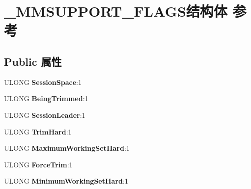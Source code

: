 \hypertarget{struct___m_m_s_u_p_p_o_r_t___f_l_a_g_s}{}\section{\+\_\+\+M\+M\+S\+U\+P\+P\+O\+R\+T\+\_\+\+F\+L\+A\+G\+S结构体 参考}
\label{struct___m_m_s_u_p_p_o_r_t___f_l_a_g_s}
\subsection*{Public 属性}
\begin{DoxyCompactItemize}
\item 
\mbox{\label{struct___m_m_s_u_p_p_o_r_t___f_l_a_g_s_a747984711b7c595f2d9e886e99a3a227}} 
U\+L\+O\+NG {\bfseries Session\+Space}\+:1
\item 
\mbox{\label{struct___m_m_s_u_p_p_o_r_t___f_l_a_g_s_a6297001da1ee1ba550d02cd224c854d2}} 
U\+L\+O\+NG {\bfseries Being\+Trimmed}\+:1
\item 
\mbox{\label{struct___m_m_s_u_p_p_o_r_t___f_l_a_g_s_a5ec9a6736d904c736a9c7a359b92b44a}} 
U\+L\+O\+NG {\bfseries Session\+Leader}\+:1
\item 
\mbox{\label{struct___m_m_s_u_p_p_o_r_t___f_l_a_g_s_a2d2ac2c72ac7b92188e0c9872f24acf5}} 
U\+L\+O\+NG {\bfseries Trim\+Hard}\+:1
\item 
\mbox{\label{struct___m_m_s_u_p_p_o_r_t___f_l_a_g_s_a0e58efd67b5e6e0b676c19509f1fd074}} 
U\+L\+O\+NG {\bfseries Maximum\+Working\+Set\+Hard}\+:1
\item 
\mbox{\label{struct___m_m_s_u_p_p_o_r_t___f_l_a_g_s_aae9ac4bfe269e3ade4d3c69719ed5dd7}} 
U\+L\+O\+NG {\bfseries Force\+Trim}\+:1
\item 
\mbox{\label{struct___m_m_s_u_p_p_o_r_t___f_l_a_g_s_a1137b01883234feaef0ae28f9ccf19cc}} 
U\+L\+O\+NG {\bfseries Minimum\+Working\+Set\+Hard}\+:1
\item 

\end{DoxyCompactItemize}

